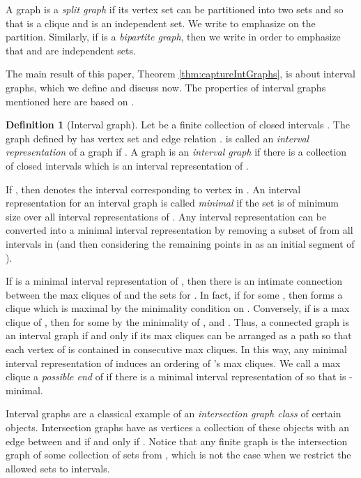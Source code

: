 \documentclass[10pt]{article}
\theoremstyle{remark}
\theoremstyle{definition}
\newtheorem{definition}[thm]{Definition}
\theoremstyle{plain}
\begin{document}
A graph  is a \emph{split graph} if its vertex set can be partitioned into two sets  and  so that  is a clique and  is an independent set. We write  to emphasize on the partition. Similarly, if  is a \emph{bipartite graph}, then we write  in order to emphasize that  and  are independent sets.




The main result of this paper, Theorem \ref{thm:captureIntGraphs}, is about interval graphs, which we define and discuss now. The properties of interval graphs mentioned here are based on \cite{gilmore64characterization}.

\begin{definition}[Interval graph]
Let  be a finite collection of closed intervals . The graph  defined by  has vertex set  and edge relation .  is called an \emph{interval representation} of a graph  if . A graph  is an \emph{interval graph} if there is a collection of closed intervals  which is an interval representation of .
\end{definition}

If , then  denotes the interval corresponding to vertex  in . An interval representation  for an interval graph  is called \emph{minimal} if the set  is of minimum size over all interval representations of . Any interval representation  can be converted into a minimal interval representation by removing a subset of  from all intervals in  (and then considering the remaining points in  as an initial segment of ).



If  is a minimal interval representation of , then there is an intimate connection between the max cliques of  and the sets  for . In fact, if  for some , then  forms a clique which is maximal by the minimality condition on . Conversely, if  is a max clique of , then  for some  by the minimality of , and . Thus, a connected graph  is an interval graph if and only if its max cliques can be arranged as a path so that each vertex of  is contained in consecutive max cliques. In this way, any minimal interval representation  of  induces an ordering  of 's max cliques. We call a max clique  a \emph{possible end} of  if there is a minimal interval representation  of  so that  is -minimal.

Interval graphs are a classical example of an \emph{intersection graph class} of certain objects. Intersection graphs have as vertices a collection  of these objects with an edge between  and  if and only if . Notice that any finite graph is the intersection graph of some collection of sets from , which is not the case when we restrict the allowed sets to intervals.
\end{document}
